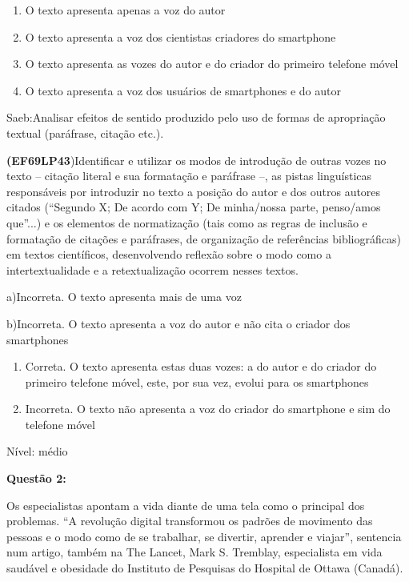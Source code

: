 {\begin{enumerate}
\def\labelenumi{\alph{enumi})}
\item
  O texto apresenta apenas a voz do autor
\item
  O texto apresenta a voz dos cientistas criadores do smartphone
\item
  O texto apresenta as vozes do autor e do criador do primeiro telefone
  móvel
\item
  O texto apresenta a voz dos usuários de smartphones e do autor
\end{enumerate}

Saeb:Analisar efeitos de sentido produzido pelo uso de formas de
apropriação textual (paráfrase, citação etc.).

\textbf{(EF69LP43})Identificar e utilizar os modos de introdução de
outras vozes no texto -- citação literal e sua formatação e paráfrase
--, as pistas linguísticas responsáveis por introduzir no texto a
posição do autor e dos outros autores citados (``Segundo X; De acordo
com Y; De minha/nossa parte, penso/amos que''...) e os elementos de
normatização (tais como as regras de inclusão e formatação de citações e
paráfrases, de organização de referências bibliográficas) em textos
científicos, desenvolvendo reflexão sobre o modo como a
intertextualidade e a retextualização ocorrem nesses textos.

a)Incorreta. O texto apresenta mais de uma voz

b)Incorreta. O texto apresenta a voz do autor e não cita o criador dos
smartphones

\begin{enumerate}
\def\labelenumi{\arabic{enumi}.}
\item
  Correta. O texto apresenta estas duas vozes: a do autor e do criador
  do primeiro telefone móvel, este, por sua vez, evolui para os
  smartphones
\item
  Incorreta. O texto não apresenta a voz do criador do smartphone e sim
  do telefone móvel
\end{enumerate}

Nível: médio

\textbf{Questão 2:}

Os especialistas apontam a vida diante de uma tela como o principal dos
problemas. ``A revolução digital transformou os padrões de movimento das
pessoas e o modo como de se trabalhar, se divertir, aprender e viajar'',
sentencia num artigo, também na The Lancet, Mark S. Tremblay,
especialista em vida saudável e obesidade do Instituto de Pesquisas do
Hospital de Ottawa (Canadá).

}
